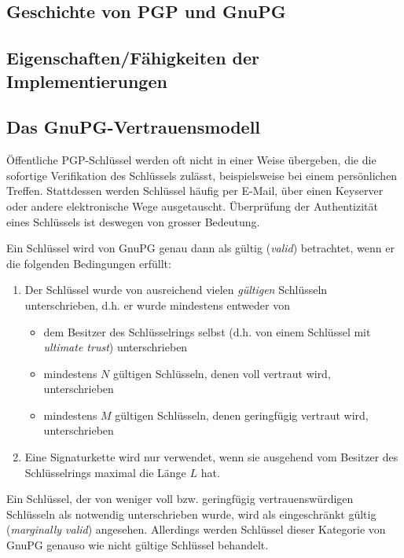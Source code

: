 \subsection{Geschichte von PGP und GnuPG}
\label{ch:Grundlagen:sec:PGP:subsec:Geschichte}

\subsection{Eigenschaften/Fähigkeiten der Implementierungen}
\label{ch:Grundlagen:sec:PGP:subsec:Eigenschaften}

\subsection{Das GnuPG-Vertrauensmodell}
\label{sec:das-gnupg-vertrauensmodell}

Öffentliche PGP-Schlüssel werden oft nicht in einer Weise übergeben,
die die sofortige Verifikation des Schlüssels zulässt, beispielsweise
bei einem persönlichen Treffen. Stattdessen werden Schlüssel häufig
per E-Mail, über einen Keyserver oder andere elektronische Wege
ausgetauscht.  Überprüfung der Authentizität eines Schlüssels ist
deswegen von grosser Bedeutung.

Ein Schlüssel wird von GnuPG genau dann als gültig (\emph{valid})
betrachtet, wenn er die folgenden Bedingungen erfüllt:

\begin{enumerate}
\item Der Schlüssel wurde von ausreichend vielen \emph{gültigen} Schlüsseln
  unterschrieben, d.h. er wurde mindestens entweder von
  \begin{itemize}
  \item dem Besitzer des Schlüsselrings selbst (d.h. von einem
    Schlüssel mit \emph{ultimate trust}) unterschrieben
  \item mindestens $N$ gültigen Schlüsseln, denen voll vertraut wird, unterschrieben
  \item mindestens $M$ gültigen Schlüsseln, denen geringfügig
    vertraut wird, unterschrieben
  \end{itemize}
\item Eine Signaturkette wird nur verwendet, wenn sie ausgehend vom
  Besitzer des Schlüsselrings maximal die Länge $L$ hat.
\end{enumerate}

Ein Schlüssel, der von weniger voll bzw. geringfügig
vertrauenswürdigen Schlüsseln als notwendig unterschrieben wurde, wird
als eingeschränkt gültig (\emph{marginally valid})
angesehen. Allerdings werden Schlüssel dieser Kategorie von GnuPG
genauso wie nicht gültige Schlüssel behandelt.

